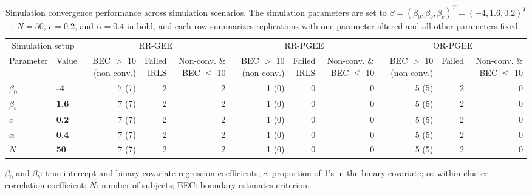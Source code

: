 \begin{table}[htbp]
\centering
\scriptsize
\setlength{\tabcolsep}{3pt}
\renewcommand{\arraystretch}{1.15}
\caption{Simulation convergence performance across simulation scenarios. The simulation parameters are set to $\beta = (\beta_0, \beta_b, \beta_c)^T = (-4, 1.6, 0.2)^T$, $N = 50$, $c = 0.2$, and $\alpha = 0.4$ in bold, and each row summarizes replications with one parameter altered and all other parameters fixed.}
\begin{tabular}{ll|rrr|rrr|rrr}
\hline
\multicolumn{2}{c|}{Simulation setup} & \multicolumn{3}{c|}{RR-GEE} & \multicolumn{3}{c|}{RR-PGEE} & \multicolumn{3}{c}{OR-PGEE} \\
Parameter & Value & \shortstack{BEC $>$ 10\\(non-conv.)} & \shortstack{Failed\\IRLS} & \shortstack{Non-conv.\\\& BEC $\leq$ 10} & \shortstack{BEC $>$ 10\\(non-conv.)} & \shortstack{Failed\\IRLS} & \shortstack{Non-conv.\\\& BEC $\leq$ 10} & \shortstack{BEC $>$ 10\\(non-conv.)} & Failed & \shortstack{Non-conv.\\\& BEC $\leq$ 10} \\
\hline
$\beta_0$ & \textbf{-4} & 7 (7) & 2 & 2 & 1 (0) & 0 & 0 & 5 (5) & 2 & 0 \\
\hline
$\beta_b$ & \textbf{1.6} & 7 (7) & 2 & 2 & 1 (0) & 0 & 0 & 5 (5) & 2 & 0 \\
\hline
$c$ & \textbf{0.2} & 7 (7) & 2 & 2 & 1 (0) & 0 & 0 & 5 (5) & 2 & 0 \\
\hline
$\alpha$ & \textbf{0.4} & 7 (7) & 2 & 2 & 1 (0) & 0 & 0 & 5 (5) & 2 & 0 \\
\hline
$N$ & \textbf{50} & 7 (7) & 2 & 2 & 1 (0) & 0 & 0 & 5 (5) & 2 & 0 \\
\hline
\end{tabular}
\begin{flushleft}
\footnotesize $\beta_0$ and $\beta_b$: true intercept and binary covariate regression coefficients; $c$: proportion of 1's in the binary covariate; $\alpha$: within-cluster correlation coefficient; $N$: number of subjects; BEC: boundary estimates criterion.
\end{flushleft}
\end{table}
